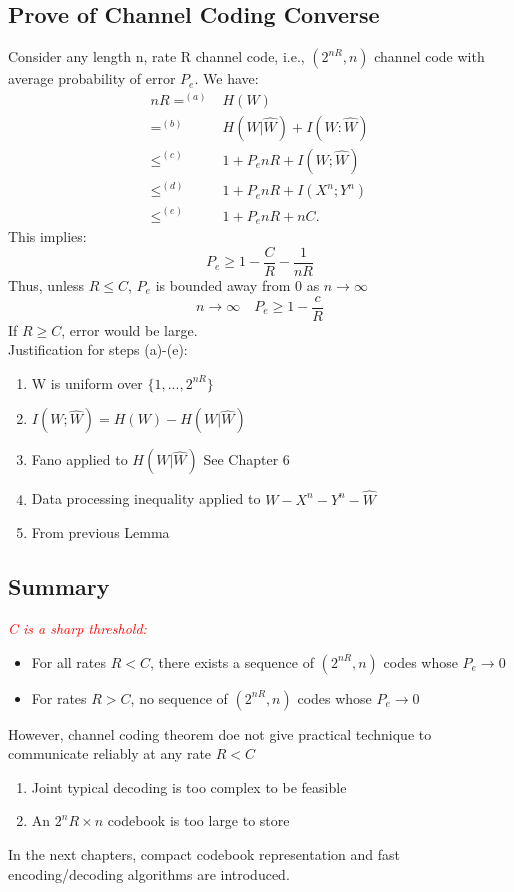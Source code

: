\documentclass[12pt]{article}
\begin{document}
\subsection{Prove of Channel Coding Converse}
Consider any length n, rate R channel code, i.e., $(2^{nR},n)$ channel code with average probability of error $P_e$. We have:
\begin{align*}
    nR =^{(a)} & H(W)\\
    =^{(b)}& H(W|\hat{W}) +I(W:\hat{W})\\
    \le^{(c)} & 1+ P_e nR+I(W;\hat{W})\\
    \le^{(d)} & 1 + P_e nR + I(X^n;Y^n)\\
    \le^{(e)} & 1 + P_e nR + nC. 
\end{align*}
This implies:
\[
    P_e \ge 1-\frac{C}{R} - \frac{1}{nR}
\]
Thus, unless $R\le C$, $P_e$ is bounded away from 0 as $n\rightarrow \infty$
\[
n\rightarrow \infty \quad P_e \ge 1 - \frac{c}{R}
\]
If $R \ge C$, error would be large.\\
Justification for steps (a)-(e):
\begin{enumerate}[label=(\alph*)]
    \item W is uniform over $\{1,...,2^{nR}\}$
    \item $I(W;\hat{W}) = H(W) - H(W|\hat{W})$
    \item Fano applied to $H(W|\hat{W})$ See Chapter 6
    \item Data processing inequality applied to $W-X^n-Y^n-\hat{W}$
    \item From previous Lemma
\end{enumerate}
\subsection{Summary}
\textcolor{red}{\textit{C is a sharp threshold:}}
\begin{itemize}
    \item For all rates $R<C$, there exists a sequence of $(2^{nR},n)$ codes whose $P_e \rightarrow 0$
    \item For rates $R>C$, no sequence of $(2^{nR},n)$ codes whose $P_e \rightarrow 0$
\end{itemize}
However, channel coding theorem doe not give practical technique to communicate reliably at any rate $R<C$
\begin{enumerate}
    \item Joint typical decoding is too complex to be feasible 
    \item An $2^nR \times n$ codebook is too large to store
\end{enumerate}
In the next chapters, compact codebook representation and fast encoding/decoding algorithms are introduced.
\end{document}
